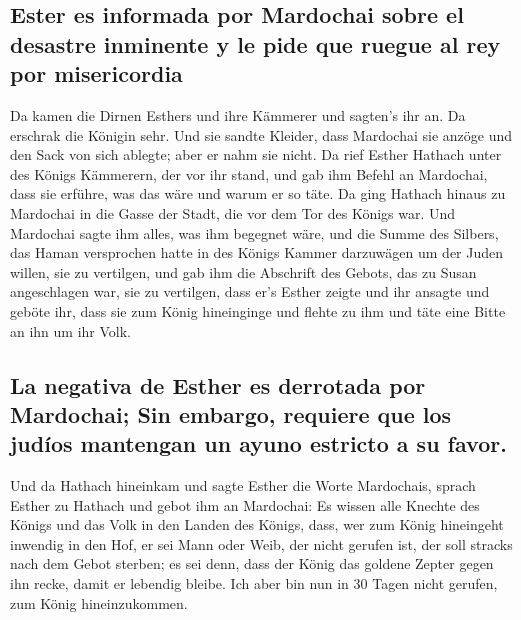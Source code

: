 \hypertarget{ester-es-informada-por-mardochai-sobre-el-desastre-inminente-y-le-pide-que-ruegue-al-rey-por-misericordia}{%
\subsection{Ester es informada por Mardochai sobre el desastre inminente
y le pide que ruegue al rey por
misericordia}\label{ester-es-informada-por-mardochai-sobre-el-desastre-inminente-y-le-pide-que-ruegue-al-rey-por-misericordia}}

 Da kamen die Dirnen Esthers und ihre Kämmerer und
sagten's ihr an. Da erschrak die Königin sehr. Und sie sandte Kleider,
dass Mardochai sie anzöge und den Sack von sich ablegte; aber er nahm
sie nicht.  Da rief Esther Hathach unter des Königs
Kämmerern, der vor ihr stand, und gab ihm Befehl an Mardochai, dass sie
erführe, was das wäre und warum er so täte.  Da ging
Hathach hinaus zu Mardochai in die Gasse der Stadt, die vor dem Tor des
Königs war.  Und Mardochai sagte ihm alles, was ihm
begegnet wäre, und die Summe des Silbers, das Haman versprochen hatte in
des Königs Kammer darzuwägen um der Juden willen, sie zu vertilgen,
 und gab ihm die Abschrift des Gebots, das zu Susan
angeschlagen war, sie zu vertilgen, dass er's Esther zeigte und ihr
ansagte und geböte ihr, dass sie zum König hineinginge und flehte zu ihm
und täte eine Bitte an ihn um ihr Volk.

\hypertarget{la-negativa-de-esther-es-derrotada-por-mardochai-sin-embargo-requiere-que-los-juduxedos-mantengan-un-ayuno-estricto-a-su-favor.}{%
\subsection{La negativa de Esther es derrotada por Mardochai; Sin
embargo, requiere que los judíos mantengan un ayuno estricto a su
favor.}\label{la-negativa-de-esther-es-derrotada-por-mardochai-sin-embargo-requiere-que-los-juduxedos-mantengan-un-ayuno-estricto-a-su-favor.}}

 Und da Hathach hineinkam und sagte Esther die Worte
Mardochais,  sprach Esther zu Hathach und gebot ihm an
Mardochai:  Es wissen alle Knechte des Königs und das
Volk in den Landen des Königs, dass, wer zum König hineingeht inwendig
in den Hof, er sei Mann oder Weib, der nicht gerufen ist, der soll
stracks nach dem Gebot sterben; es sei denn, dass der König das goldene
Zepter gegen ihn recke, damit er lebendig bleibe. Ich aber bin nun in 30
Tagen nicht gerufen, zum König hineinzukommen.

